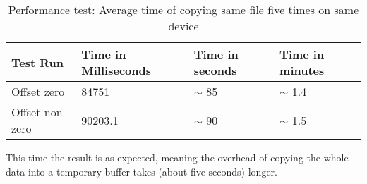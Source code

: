 \begin{table}[ht]
\caption{Performance test: Average time of copying same file five times on same device}
\centering
\begin{tabular}{|l|l|l|l|}
\hline\hline
\textbf{Test Run} & \textbf{Time in Milliseconds} & \textbf{Time in seconds} & \textbf{Time in minutes} \\ \hline
Offset zero & 84751 & $\sim$ 85 & $\sim$ 1.4 \\ \hline
Offset non zero & 90203.1 & $\sim$ 90 & $\sim$ 1.5 \\ \hline
\end{tabular}
\label{table:performance_test2}
\end{table}

This time the result is as expected, meaning the overhead of copying the whole data into a temporary buffer takes (about five seconds) longer.